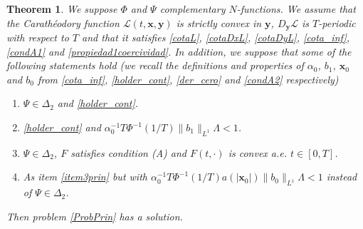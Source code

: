 \documentclass[twoside]{article}
\newtheorem{thm}{Theorem}[section]
\theoremstyle{remark}
\renewcommand{\b}[1]{\boldsymbol{#1}}
\begin{document}
\begin{thm} We suppose $\Phi$ and $\Psi$ complementary $N$-functions. We assume that the Carath\'eodory function $\mathcal{L}(t,\b{x},\b{y})$ is strictly convex in $\b{y}$, $D_{\b{y}}\mathcal{L}$ is $T$-periodic with respect to $T$  and that it satisfies \eqref{cotaL}, \eqref{cotaDxL}, \eqref{cotaDyL}, \eqref{cota_inf}, \eqref{condA1} and \eqref{propiedad1coercividad}. In addition, we suppose that some of the following statements hold (we recall the definitions and properties of $\alpha_0$, $b_1$, $\b{x}_0$ and $b_0$ from \eqref{cota_inf}, \eqref{holder_cont}, \eqref{der_cero} and \eqref{condA2} respectively)
\begin{enumerate}
  \item\label{item1prin} $\Psi\in\Delta_2$ and  \eqref{holder_cont}.
\item \eqref{holder_cont} and  $\alpha_0^{-1}T\Phi^{-1}\left(1/T\right)\|b_1\|_{L^1}\Lambda<1$.

\item\label{item3prin} $\Psi\in\Delta_2$,  $F$ satisfies condition (A) and  $F(t,\cdot)$ is  convex  a.e. $t\in [0,T]$.

\item\label{item4prin} As item \ref{item3prin} but with $\alpha_0^{-1}T\Phi^{-1}\left(1/T\right)a(|\b{x}_0|)\|b_0\|_{L^1} \Lambda<1$ instead of $\Psi\in\Delta_2$.

\end{enumerate}
Then problem \eqref{ProbPrin} has a solution.
\end{thm}
\end{document}
